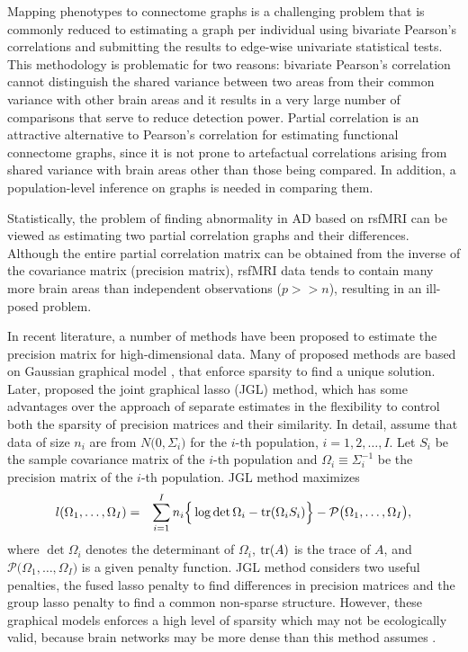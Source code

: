 \documentclass[useAMS,usenatbib,referee]{bio}
\begin{document}
Mapping phenotypes to connectome graphs is a challenging problem that is commonly reduced to estimating a graph per individual using bivariate Pearson's correlations and submitting the results to edge-wise univariate statistical tests. This methodology is problematic for two reasons: bivariate Pearson's correlation cannot distinguish the shared variance between two areas from their common variance with other brain areas and it results in a very large number of comparisons that serve to reduce detection power. 
Partial correlation is an attractive alternative to Pearson's correlation for estimating functional connectome graphs, since it is not prone to artefactual correlations arising from shared variance with brain areas other than those being compared. 
In addition, a population-level inference on graphs is needed in comparing them.

Statistically, the problem of finding abnormality in AD based on rsfMRI can be viewed as estimating two partial correlation graphs and their differences. 
Although the entire partial correlation matrix can be obtained from the inverse of the covariance matrix (precision matrix), rsfMRI data tends to contain many more brain areas than independent observations ($p >> n$), resulting in an ill-posed problem. 

In recent literature, a number of methods have been proposed to estimate the precision matrix for high-dimensional data. Many of proposed methods are based on Gaussian graphical model \citep{Meinshausen:2006,Yuan:2007,Rothman:2008}, that enforce sparsity to find a unique solution. 
Later, \citet{Danaher:2014} proposed the joint graphical lasso (JGL) method, which has some advantages over the approach of separate estimates in the flexibility to control both the sparsity of precision matrices and their similarity.
In detail, assume that data of size $n_i$ are from $N \big(0, \Sigma_i\big)$ for the $i$-th population, $i=1,2,\ldots, I$.
Let $S_i$ be the sample covariance matrix of the $i$-th population and $\Omega_i\equiv \Sigma_i^{-1}$ be the precision matrix of the $i$-th population.
JGL method maximizes
\begin{eqnarray*}
l(\Omega_1,\ldots,\Omega_I)
&=& \sum_{i=1}^I n_i \Big\{ \log\det
\Omega_i - {\rm tr}(\Omega_i {S}_i ) \Big\}  - \mathcal{P} \big( \Omega_1,\ldots,\Omega_I \big),
\end{eqnarray*}
where $\det \Omega_i$ denotes the determinant of $\Omega_i$, ${\rm tr}(A)$ is the trace of $A$, and $\mathcal{P} \big( \Omega_1,\ldots,\Omega_I \big)$ is a given penalty function. JGL method considers two useful penalties, the fused lasso penalty to find differences in precision matrices and the group lasso penalty to find a common non-sparse structure.
However, these graphical models enforces a high level of sparsity which may not be ecologically valid, because brain networks may be more dense than this method assumes \citep{Ryali2012}.
\end{document}
